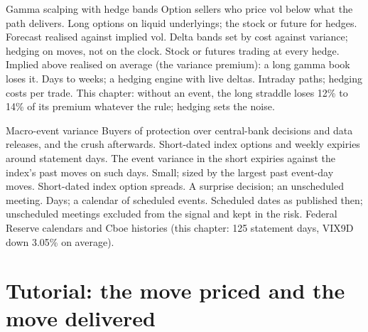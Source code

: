 \begin{strategyfile}{Gamma scalping with hedge bands}\label{strat:s2:gamma-scalping-and-event-volatility:bands}
 Option sellers who price vol below what the path delivers.
 Long options on liquid underlyings; the stock or future for hedges.
 Forecast realised against implied vol.
 Delta bands set by cost against variance; hedging on moves, not on the clock.
 Stock or futures trading at every hedge.
 Implied above realised on average (the variance premium): a long gamma book loses it.
 Days to weeks; a hedging engine with live deltas.
 Intraday paths; hedging costs per trade.
 This chapter: without an event, the long straddle loses 12\% to 14\% of its premium whatever the rule; hedging sets the noise.
\end{strategyfile}

\begin{strategyfile}{Macro-event variance}\label{strat:s2:gamma-scalping-and-event-volatility:macro}
 Buyers of protection over central-bank decisions and data releases, and the crush afterwards.
 Short-dated index options and weekly expiries around statement days.
 The event variance in the short expiries against the index's past moves on such days.
 Small; sized by the largest past event-day moves.
 Short-dated index option spreads.
 A surprise decision; an unscheduled meeting.
 Days; a calendar of scheduled events.
 Scheduled dates as published then; unscheduled meetings excluded from the signal and kept in the risk.
 Federal Reserve calendars and Cboe histories (this chapter: 125 statement days, VIX9D down 3.05\% on average).
\end{strategyfile}

\section{Tutorial: the move priced and the move delivered}\label{tut:s2:gamma-scalping-and-event-volatility:tut}

